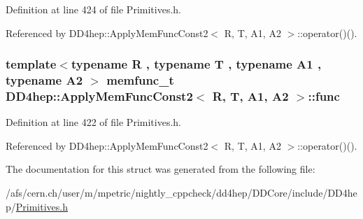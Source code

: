 Definition at line 424 of file Primitives.h.

Referenced by DD4hep::ApplyMemFuncConst2$<$ R, T, A1, A2 $>$::operator()().\hypertarget{struct_d_d4hep_1_1_apply_mem_func_const2_a9a9dc912d8f9b572a684ebe92aa0af6d}{
\subsubsection[{func}]{\setlength{\rightskip}{0pt plus 5cm}template$<$typename R , typename T , typename A1 , typename A2 $>$ {\bf memfunc\_\-t} {\bf DD4hep::ApplyMemFuncConst2}$<$ R, {\bf T}, A1, A2 $>$::{\bf func}}}
\label{struct_d_d4hep_1_1_apply_mem_func_const2_a9a9dc912d8f9b572a684ebe92aa0af6d}


Definition at line 422 of file Primitives.h.

Referenced by DD4hep::ApplyMemFuncConst2$<$ R, T, A1, A2 $>$::operator()().

The documentation for this struct was generated from the following file:\begin{DoxyCompactItemize}
\item 
/afs/cern.ch/user/m/mpetric/nightly\_\-cppcheck/dd4hep/DDCore/include/DD4hep/\hyperlink{_primitives_8h}{Primitives.h}\end{DoxyCompactItemize}
